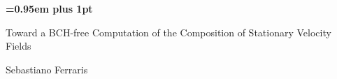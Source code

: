 \documentclass[a4paper,10pt]{book}
\theoremstyle{definition}
\begin{document}
\begin{titlepage}
%
\pagestyle{empty}
\begingroup
\vspace*{-7\topskip}

\vspace{2 cm}

\begin{center}
        {\huge\bf \baselineskip=0.95em plus 1pt \expandafter{
        Toward a BCH-free Computation of the Composition of Stationary Velocity Fields
        \par}}
\end{center}

\vspace{0.5cm}
\begin{center}
	{\LARGE{Sebastiano Ferraris}\par}
\end{center}


\vspace{2cm}
\begin{figure}[!h]
\begin{center}
\end{center}
\end{figure}
\vspace{1.3cm}


\end{titlepage}
\end{document}

